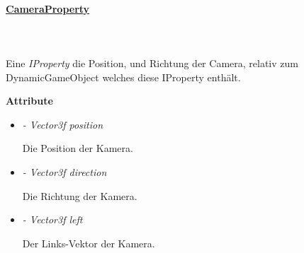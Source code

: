         \paragraph{\underline{CameraProperty}} \mbox{}\\
        \\
            Eine \textit{IProperty} die Position, und Richtung der Camera, relativ zum DynamicGameObject welches diese IProperty enthält.\par

            \textbf{Attribute}
            \begin{itemize}
                \item \textit{- Vector3f position}
                    \begin{leftbar}[0.9\linewidth]
                        Die Position der Kamera.
                    \end{leftbar}
                \item \textit{- Vector3f direction}
                    \begin{leftbar}[0.9\linewidth]
                        Die Richtung der Kamera.
                    \end{leftbar}
                \item \textit{- Vector3f left}
                    \begin{leftbar}[0.9\linewidth]
                        Der Links-Vektor der Kamera.
                    \end{leftbar}
            \end{itemize}

